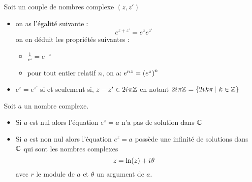 \begin{prop}
    Soit un couple de nombres complexe \((z,z')\)
    \begin{itemize}
        \item on as l'égalité suivante : 
        \[e^{z+z'} = e^ze^{z'}\]
        on en déduit les propriétés suivantes :
        \begin{itemize}
            \item \(\frac{1}{e^z} = e^{-z}\)
            \item pour tout entier relatif \(n\), on a: \(e^{nz} = \left(e^z\right)^n\)
        \end{itemize}
        \item \(e^z = e^{z'}\) si et seulement si, \(z-z' \in 2i\mkern1mu\pi \mathbb{Z}\) en notant \(2i\mkern1mu \pi \mathbb{Z} =\left\lbrace2i\mkern1mu k \pi \;\middle|\; k\in \mathbb{Z}\right\rbrace\)
    \end{itemize}
\end{prop}
\begin{defprop}[Résolution de l'équations \(e^z = a\) avec \(a\) un nombre complexe]
    Soit \(a\) un nombre complexe. \\
    \begin{itemize}
        \item Si \(a\) est nul alors l'équation \(e^z = a\) n'a pas de solution dans \(\mathbb{C}\)
        \item Si \(a\) est non nul alors l'équation \(e^z = a\) possède une infinité de solutions dans \(\mathbb{C}\) qui sont les nombres complexes 
        \[z= \ln(z)+i\mkern1mu \theta\]
        avec \(r\) le module de \(a\) et \(\theta\) un argument de \(a\).
    \end{itemize}
\end{defprop}

